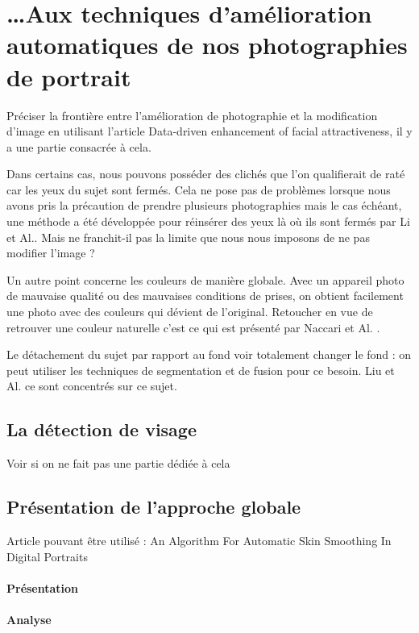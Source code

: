 \documentclass[11pt, french]{report-rd-info}
\begin{document}
\section{\ldots Aux techniques d’amélioration automatiques de nos photographies de portrait}
Préciser la frontière entre l’amélioration de photographie et la modification d’image en utilisant l’article Data-driven enhancement of facial attractiveness, il y a une partie consacrée à cela.

Dans certains cas, nous pouvons posséder des clichés que l'on qualifierait de raté car les yeux du sujet sont fermés. Cela ne pose pas de problèmes lorsque nous avons pris la précaution de prendre plusieurs photographies mais le cas échéant, une méthode a été développée pour réinsérer des yeux là où ils sont fermés par Li et Al.\cite{Li2011}. 
Mais ne franchit-il pas la limite que nous nous imposons de ne pas modifier l’image ?

Un autre point concerne les couleurs de manière globale. Avec un appareil photo de mauvaise qualité ou des mauvaises conditions de prises, on obtient facilement une photo avec des couleurs qui dévient de l’original. Retoucher en vue de retrouver une couleur naturelle c'est ce qui est présenté par Naccari et Al. \cite{Naccari}.

Le détachement du sujet par rapport au fond voir totalement changer le fond : on peut utiliser les techniques de segmentation et de fusion pour ce besoin. Liu et Al. \cite{Liu2007} ce sont concentrés sur ce sujet.

\subsection{La détection de visage}
Voir si on ne fait pas une partie dédiée à cela

\subsection{Présentation de l’approche globale}
Article pouvant être utilisé : An Algorithm For Automatic Skin Smoothing In Digital Portraits

\paragraph{Présentation }

\paragraph{Analyse }
\end{document}
